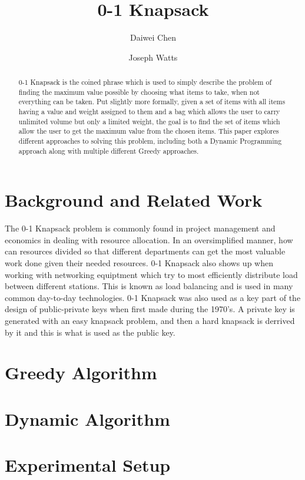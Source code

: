 \documentclass[10pt, letterpaper]{article}
\title{0-1 Knapsack}
\author{Daiwei Chen \and Joseph Watts}
\begin{document}
\maketitle
	\begin{abstract}
		0-1 Knapsack is the coined phrase which is used to simply describe the problem of finding the maximum value possible by choosing what items to take, when not everything can be taken.
		Put slightly more formally, given a set of items with all items having a value and weight assigned to them and a bag which allows the user to carry unlimited volume but only a limited weight, the goal is to find the set of items which allow the user to get the maximum value from the chosen items.
		This paper explores different approaches to solving this problem, including both a Dynamic Programming approach along with multiple different Greedy approaches.
	\end{abstract}

\section{Background and Related Work}
The 0-1 Knapsack problem is commonly found in project management and economics in dealing with resource allocation. In an oversimplified manner, how can resources divided so that different departments can get the most valuable work done given their needed resources.
0-1 Knapsack also shows up when working with networking equiptment which try to most efficiently distribute load between different stations.
This is known as load balancing and is used in many common day-to-day technologies.
0-1 Knapsack was also used as a key part of the design of public-private keys when first made during the 1970's. A private key is generated with an easy knapsack problem, and then a hard knapsack is derrived by it and this is what is used as the public key.
\section{Greedy Algorithm}

\section{Dynamic Algorithm}

\section{Experimental Setup}
\end{document}
